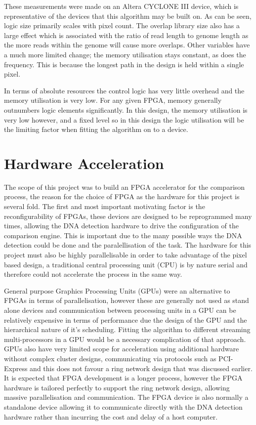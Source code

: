 These measurements were made on an Altera CYCLONE III device, which is representative of the devices that this algorithm may be built on. As can be seen, logic size primarily scales with pixel count. The overlap library size also has a large effect which is associated with the ratio of read length to genome length as the more reads within the genome will cause more overlaps. Other variables have a much more limited change; the memory utilisation stays constant, as does the frequency. This is because the longest path in the design is held within a single pixel. 


In terms of absolute resources the control logic has very little overhead and the memory utilisation is very low. For any given FPGA, memory generally outnumbers logic elements significantly. In this design, the memory utilisation is very low however, and a fixed level so in this design the logic utilisation will be the limiting factor when fitting the algorithm on to a device.

\section{Hardware Acceleration}

The scope of this project was to build an FPGA accelerator for the comparison process, the reason for the choice of FPGA as the hardware for this project is several fold. The first and most important motivating factor is the reconfigurability of FPGAs, these devices are designed to be reprogrammed many times, allowing the DNA detection hardware to drive the configuration of the comparison engine. This is important due to the many possible ways the DNA detection could be done and the paralellisation of the task. The hardware for this project must also be highly parallelisable in order to take advantage of the pixel based design, a traditional central processing unit (CPU) is by nature serial and therefore could not accelerate the process in the same way. 

General purpose Graphics Processing Units (GPUs) were an alternative to FPGAs in terms of parallelisation, however these are generally not used as stand alone devices and communication between processing units in a GPU can be relatively expensive in terms of performance due the design of the GPU and the hierarchical nature of it's scheduling. Fitting the algorithm to different streaming multi-processors in a GPU would be a necessary complication of that approach. GPUs also have very limited scope for acceleration using additional hardware without complex cluster designs, communicating via protocols such as PCI-Express and this does not favour a ring network design that was discussed earlier. It is expected that FPGA development is a longer process, however the FPGA hardware is tailored perfectly to support the ring network design, allowing massive parallelisation and communication. The FPGA device is also normally a standalone device allowing it to communicate directly with the DNA  detection hardware rather than incurring the cost and delay of a host computer.



